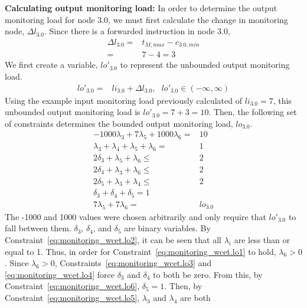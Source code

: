 {\bf Calculating output monitoring load:}
In order to determine the output monitoring load for node 3.0, we must first
calculate the change in monitoring node, $\Delta l_{3.0}$. Since there is a
forwarded instruction in node 3.0,
\begin{align*}
  \Delta l_{3.0} =& t_{M, max} - c_{3.0, min} \\
  =& 7 - 4 = 3
\end{align*}
We first create a variable, $lo'_{3.0}$ to represent the unbounded output
monitoring load.
\begin{align*}
  lo'_{3.0} =& li_{3.0} + \Delta l_{3.0}, \text{ } lo'_{3.0} \in (-\infty, \infty)
\end{align*}
Using the example input monitoring load previously calculated of $li_{3.0} =
7$, this unbounded output monitoring load is $lo'_{3.0} = 7 + 3 = 10$.  Then,
the following set of constraints determines the bounded output monitoring load,
$lo_{3.0}$.
\begin{subequations}
\begin{align}
  -1000\lambda_3 + 7\lambda_5 + 1000\lambda_6 =& 10 \label{eq:monitoring_wcet.lo1}\\ 
  \lambda_3 + \lambda_4 + \lambda_5 + \lambda_6 =& 1 \label{eq:monitoring_wcet.lo2}\\
  2 \delta_3 + \lambda_5 + \lambda_6 \leq& 2 \label{eq:monitoring_wcet.lo3}\\
  2 \delta_4 + \lambda_3 + \lambda_6 \leq& 2 \label{eq:monitoring_wcet.lo4}\\
  2 \delta_5 + \lambda_3 + \lambda_4 \leq& 2 \label{eq:monitoring_wcet.lo5}\\
  \delta_3 + \delta_4 + \delta_5 = 1 \label{eq:monitoring_wcet.lo6}\\
  7\lambda_5 + 7\lambda_6 =& lo_{3.0} \label{eq:monitoring_wcet.lo7}
\end{align}
\end{subequations}
The -1000 and 1000 values were chosen arbitrarily and only require that
$lo'_{3.0}$ to fall between them. $\delta_3$, $\delta_4$, and $\delta_5$ are
binary variables. By Constraint~\ref{eq:monitoring_wcet.lo2}, it can be seen
that all $\lambda_i$ are less than or equal to 1. Thus, in order for
Constraint~\ref{eq:monitoring_wcet.lo1} to hold, $\lambda_6 >  0$. Since
$\lambda_6 > 0$, Constraints~\ref{eq:monitoring_wcet.lo3} and
\ref{eq:monitoring_wcet.lo4} force $\delta_3$ and $\delta_4$ to both be zero.
From this, by Constraint~\ref{eq:monitoring_wcet.lo6}, $\delta_5 = 1$. Then, by
Constraint~\ref{eq:monitoring_wcet.lo5}, $\lambda_3$ and $\lambda_4$ are both
